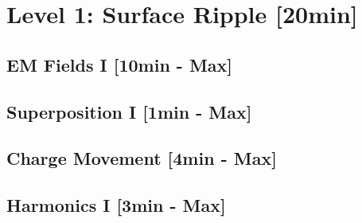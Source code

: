 
\section{Level 1: Surface Ripple [20min]}

\subsection{EM Fields I [10min - Max]}



\subsection{Superposition I [1min - Max]}

\subsection{Charge Movement [4min - Max]}



\subsection{Harmonics I [3min - Max]}
